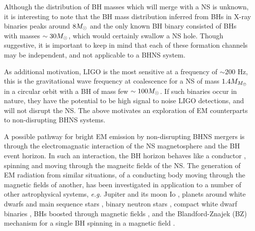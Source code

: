 Although the distribution of BH masses which will merge with
a NS is unknown, it is interesting to note that the BH mass distribution
inferred from BHs in X-ray binaries peaks around $8 {M_{\odot}}$ \citep{Ozel:2010}
and the only known BH binary consisted of BHs with masses $\sim 30 {M_{\odot}}$, which
would certainly swallow a NS hole. Though suggestive, it is important to keep
in mind that each of these formation channels may be independent, and not
applicable to a BHNS system.

As additional motivation, LIGO is the most sensitive at a frequency of $\sim
200$ Hz, this is the gravitational wave frequency at coalescence for a NS of
mass $1.4 M_{{M_{\odot}}}$ in a circular orbit with a BH of mass few $\sim100
{M_{\odot}}$. If such binaries occur in nature, they have the potential to be high
signal to noise LIGO detections, and will not disrupt the NS. The
above motivates an exploration of EM counterparts to non-disrupting BHNS
systems.


A possible pathway for bright EM emission by non-disrupting BHNS mergers is
through the electromagnatic interaction of the NS magnetosphere and the BH
event horizon. In such an interaction, the BH horizon behaves like a conductor
\citep[see][and Chapter \ref{ch:Rindler}]{MPBook}, spinning and moving through
the magneitc fields of the NS. The generation of EM radiation from similar
situations, of a conducting body moving through the magnetic fields of
another, has been investigated in application to a number of other
astrophysical systems, \textit{e.g.} Jupiter and its moon Io \citep{GLB:1969},
planets around white dwarfs \citep{Li:1998} and main sequence stars
\citep{LaineLinI:2012,LaineLinII:2012}, binary neutron stars
\citep{Vietri:1996,Piro:2012, DLai:2012, Palenzuela:2013}, compact white dwarf
binaries \citep{Wu:2002, Dall'Osso:2006, Dall'Osso:2007, DLai:2012}, BHs
boosted through magnetic fields \citep{Lyut:2011, Penna:2015}, and the
Blandford-Znajek (BZ) mechanism \citep{BZ:1977} for a single BH spinning in a
magnetic field  \citep[for recent numerical work on the BZ mechanism see \textit{e.g.}][]{PalenzuelaBZ:2011, Kiuchi:2015}.


